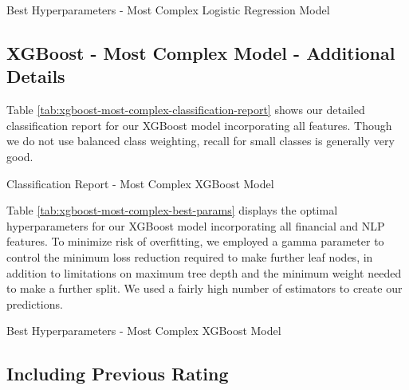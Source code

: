 \documentclass{article}[11pt]
\begin{document}
    \begin{table}[h!]
        \centering
        \caption{Best Hyperparameters - Most Complex Logistic Regression Model}
        
        \label{tab:logistic-most-complex-best-params}
    \end{table}

    \clearpage
    \newpage

    \subsection{XGBoost - Most Complex Model - Additional Details}

    \label{sec:xgboost-most-complex-model-additional-details}

    Table \ref{tab:xgboost-most-complex-classification-report} shows our detailed classification report for our XGBoost model incorporating all features. Though we do not use balanced class weighting, recall for small classes is generally very good.

    \begin{table}[h!]
        \centering
        \caption{Classification Report - Most Complex XGBoost Model}
        
        \label{tab:xgboost-most-complex-classification-report}
    \end{table}

    Table \ref{tab:xgboost-most-complex-best-params} displays the optimal hyperparameters for our XGBoost model incorporating all financial and NLP features. To minimize risk of overfitting, we employed a gamma parameter to control the minimum loss reduction required to make further leaf nodes, in addition to limitations on maximum tree depth and the minimum weight needed to make a further split. We used a fairly high number of estimators to create our predictions.

    \begin{table}[h!]
        \centering
        \caption{Best Hyperparameters - Most Complex XGBoost Model}
        
        \label{tab:xgboost-most-complex-best-params}
    \end{table}

    \clearpage
    \newpage

    \subsection{Including Previous Rating}
\end{document}
